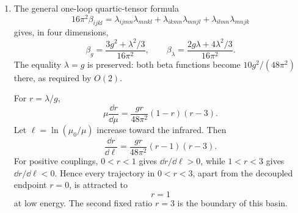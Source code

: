 \begin{enumerate}
\begin{enumerate}
For the four-point functions, define the dimensionally regulated massless
bubble \(B(q^2)\) so that
\[
 B(q^2)\big|_{\mathrm{UV}}=\frac2{16\pi^2\epsilon}.
\]
The two independent 1PI amplitudes are
\[
\begin{aligned}
 \Gamma_{1111}={}&-ig
 +\frac i2(g^2+h^2)\bigl[B(s)+B(t)+B(u)\bigr]
 -\ii\delta g,\\
 \Gamma_{1122}={}&-ih
 +\frac i2\left[2ghB(s)+2h^2B(t)+2h^2B(u)\right]
 -\ii\delta h,
\end{aligned}
\]
where \(\delta h=\delta\lambda/3\), and the assignment of \(s,t,u\) in
the second line follows the displayed external ordering.  These formulas
also give an explicit diagram census: three bubbles for four identical
external fields; for \(1122\), the \(s\)-channel has either internal
species and the crossed channels contain the mixed vertex twice.

At a chosen nonexceptional subtraction point, momentum subtraction is
implemented by
\[
\begin{aligned}
 \delta g_{\mathrm{MOM}}
 &=\frac12(g^2+h^2)
 \bigl[B(s_0)+B(t_0)+B(u_0)\bigr],\\
 \delta h_{\mathrm{MOM}}
 &=\frac12\left[2ghB(s_0)
 +2h^2B(t_0)+2h^2B(u_0)\right].
\end{aligned}
\]
These choices impose
\(\Gamma_{1111}(s_0,t_0,u_0)=-ig\) and
\(\Gamma_{1122}(s_0,t_0,u_0)=-ih\).  Their pole parts, equivalently the
minimal-subtraction counterterms, are
\[
 \boxed{\;
 \delta g=\frac{3(g^2+h^2)}{16\pi^2\epsilon},
 \qquad
 \delta h=\frac{2gh+4h^2}{16\pi^2\epsilon}.\;}
\]
Thus every one-loop divergence is canceled by a term already present in
the symmetry-closed Lagrangian.

\item
The general one-loop quartic-tensor formula
\[
 16\pi^2\beta_{ijkl}
 =\lambda_{ijmn}\lambda_{mnkl}
 +\lambda_{ikmn}\lambda_{mnjl}
 +\lambda_{ilmn}\lambda_{mnjk}
\]
gives, in four dimensions,
\[
 \boxed{\;
 \beta_g=\frac{3g^2+\lambda^2/3}{16\pi^2},
 \qquad
 \beta_\lambda
 =\frac{2g\lambda+4\lambda^2/3}{16\pi^2}.\;}
\]
The equality \(\lambda=g\) is preserved: both beta functions become
\(10g^2/(48\pi^2)\) there, as required by \(O(2)\).

For \(r=\lambda/g\),
\[
 \boxed{\;
 \mu\frac{\dd r}{\dd\mu}
 =\frac{gr}{48\pi^2}(1-r)(r-3).\;}
\]
Let \(\ell=\ln(\mu_0/\mu)\) increase toward the infrared.  Then
\[
 \frac{\dd r}{\dd\ell}
 =\frac{gr}{48\pi^2}(r-1)(r-3).
\]
For positive couplings, \(0<r<1\) gives \(\dd r/\dd\ell>0\), while
\(1<r<3\) gives \(\dd r/\dd\ell<0\).  Hence every trajectory in
\(0<r<3\), apart from the decoupled endpoint \(r=0\), is attracted to
\[
 \boxed{r=1}
\]
at low energy.  The second fixed ratio \(r=3\) is the boundary of this
basin.


\end{enumerate}
\end{enumerate}
